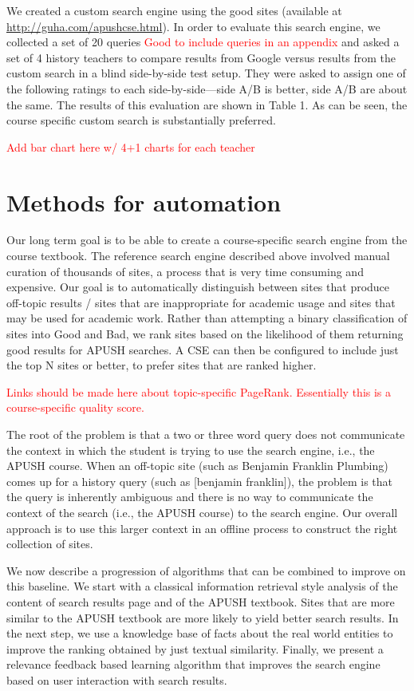 \documentclass{acm_proc_article-sp}
\begin{document}
We created a custom search engine using the good sites (available at
\url{http://guha.com/apushcse.html}). In order to evaluate this search engine,
we collected a set of 20 queries \textcolor{red}{Good to include queries in an
  appendix} and asked a set of 4 history teachers to
compare results from Google versus results from the custom search in a blind
side-by-side test setup. They were asked to assign one of the following ratings
to each side-by-side---side A/B is better, side A/B are about the same. The
results of this evaluation are shown in Table 1. As can be seen,  the course
specific custom search is substantially preferred.  

\textcolor{red}{Add bar chart here w/ 4+1 charts for each teacher}

\section{Methods for automation}

Our long term goal is to be able to create a course-specific search engine from
the course textbook. The reference search engine described above involved manual
curation of thousands of sites, a process that is very time consuming and
expensive. Our goal is to automatically distinguish between sites that produce
off-topic results / sites that are inappropriate for academic usage and sites
that may be used for academic work.  Rather than attempting a binary
classification of sites into Good and Bad, we rank sites based on the likelihood
of them returning good results for APUSH searches. A CSE can then be configured
to include just the top N sites or better, to prefer sites that are ranked
higher. 

\textcolor{red}{Links should be made here about topic-specific
  PageRank. Essentially this is a course-specific quality score.}

The root of the problem is that a two or three word query does not communicate
the context in which the student is trying to use the search engine, i.e., the
APUSH course.  When an off-topic site (such as Benjamin Franklin Plumbing) comes
up for a history query (such as [benjamin franklin]), the problem is that the
query is inherently ambiguous and there is no way to communicate the context of
the search (i.e., the APUSH course) to the search engine.  Our overall approach
is to use this larger context in an offline process to construct the right
collection of sites. 

We now describe a progression of algorithms that can be combined to improve on
this baseline. We start with a classical information retrieval style analysis of
the content of search results page and of the APUSH textbook. Sites that are
more similar to the APUSH textbook are more likely to yield better search
results. In the next step, we use a knowledge base of facts about the real world
entities to improve the ranking obtained by just textual similarity. Finally, we
present a relevance feedback based learning algorithm that improves the search
engine based on user interaction with search results. 
\end{document}
